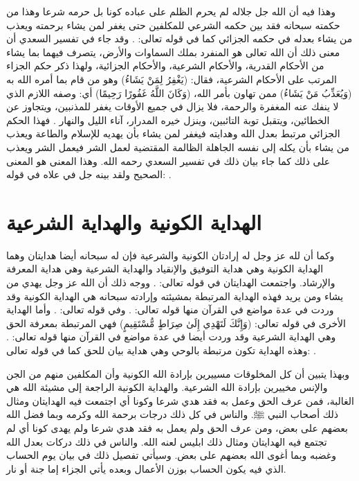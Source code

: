 وهذا فيه أن الله جل جلاله لم يحرم الظلم على عباده كونا بل حرمه شرعا وهذا من حكمته سبحانه فقد بين حكمه الشرعي للمكلفين حتى يغفر لمن يشاء برحمته ويعذب من يشاء بعدله في حكمه الجزائي كما في قوله تعالى: 
\quranayah*[48][14]{\footnotesize \surahname*[48]}.  وقد جاء في تفسير السعدي أن معنى ذلك أن الله تعالى هو المنفرد بملك السماوات والأرض، يتصرف فيهما بما يشاء من الأحكام القدرية، والأحكام الشرعية، والأحكام الجزائية، ولهذا ذكر حكم الجزاء المرتب على الأحكام الشرعية، فقال: (يَغْفِرُ لِمَنْ يَشَاءُ) وهو من قام بما أمره الله به (وَيُعَذِّبُ مَنْ يَشَاءُ) ممن تهاون بأمر الله، (وَكَانَ اللَّهُ غَفُورًا رَحِيمًا) أي: وصفه اللازم الذي لا ينفك عنه المغفرة والرحمة، فلا يزال في جميع الأوقات يغفر للمذنبين، ويتجاوز عن الخطائين، ويتقبل توبة التائبين، وينزل خيره المدرار، آناء الليل والنهار \cite{tafsir_Saadi}. فهذا الحكم الجزائي مرتبط بعدل الله وهدايته فيغفر لمن يشاء بأن يهديه للإسلام والطاعة ويعذب من يشاء بأن يكله إلى نفسه الجاهلة الظالمة المقتضية لعمل الشر فيعمل الشر ويعذب على ذلك كما جاء بيان ذلك في تفسير السعدي رحمه الله. وهذا المعنى هو المعنى الصحيح ولقد بينه جل في علاه في قوله: \quranayah*[6][125]{\footnotesize \surahname*[6]}.

\section{الهداية الكونية والهداية الشرعية}

وكما أن لله عز وجل له إرادتان الكونية والشرعية فإن له سبحانه أيضا هدايتان وهما الهداية الكونية وهي هداية التوفيق والإنقياد والهداية الشرعية وهي هداية المعرفة والإرشاد. واجتمعت الهدايتان في قوله تعالى:
\quranayah*[42][52]{\footnotesize \surahname*[42]}. ووجه ذلك أن الله عز وجل يهدي من يشاء ومن يريد فهذه الهداية المرتبطة بمشيئته وإرادته سبحانه هي الهداية الكونية وقد وردت في عدة مواضع في القرآن منها قوله تعالى:
\quranayah*[28][56]{\footnotesize \surahname*[28]}. وفي قوله تعالى:
\quranayah*[22][16]{\footnotesize \surahname*[22]}. وأما الهداية الأخرى في قوله تعالى: (وَإِنَّكَ لَتَهْدِي إِلَىٰ صِرَاطٍ مُّسْتَقِيمٍ)
فهي المرتبطة بمعرفة الحق وهي الهداية الشرعية وقد وردت أيضا في عدة مواضع في القرآن منها قوله تعالى:
\quranayah*[4][26]{\footnotesize \surahname*[4]}. وهذه الهداية تكون مرتبطة بالوحي وهي هداية بيان للحق كما في قوله تعالى:
\quranayah*[34][6]{\footnotesize \surahname*[6]}.

وبهذا يتبين أن كل المخلوقات مسييرين بإرادة الله الكونية وأن المكلفين منهم من الجن والإنس مخييرين بإرادة الله الشرعية. والهداية الكونية الراجعة إلى مشيئة الله هي الغالبة، فمن عرف الحق وعمل به فقد هدي شرعا وكونا أي اجتمعت فيه الهدايتان ومثال ذلك أصحاب النبي ﷺ. والناس في كل ذلك درجات برحمة الله وكرمه وبما فضل الله بعضهم على بعض،
ومن عرف الحق ولم يعمل به فقد هدي شرعا ولم يهدى كونا أي لم تجتمع فيه الهدايتان ومثال ذلك ابليس لعنه الله. والناس في ذلك دركات بعدل الله وغضبه وبما أغوى الله بعضهم على بعض. وسيأتي تفصيل ذلك في بيان يوم الحساب الذي فيه يكون الحساب بوزن الأعمال وبعده يأتي الجزاء إما جنة أو نار. 

